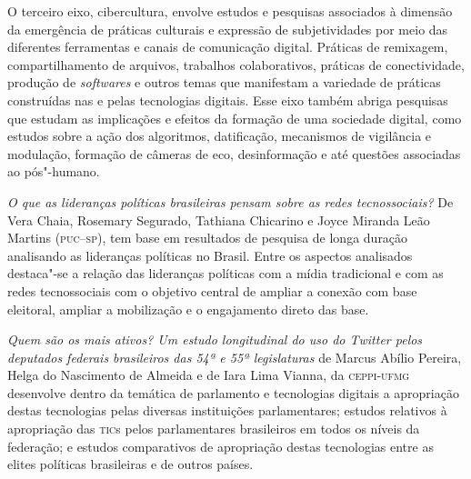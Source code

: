 O terceiro eixo, cibercultura, envolve estudos e pesquisas associados à
dimensão da emergência de práticas culturais e expressão de
subjetividades por meio das diferentes ferramentas e canais de
comunicação digital. Práticas de remixagem, compartilhamento de
arquivos, trabalhos colaborativos, práticas de conectividade, produção
de \emph{softwares} e outros temas que manifestam a variedade de práticas
construídas nas e pelas tecnologias digitais. Esse eixo também abriga
pesquisas que estudam as implicações e efeitos da formação de uma
sociedade digital, como estudos sobre a ação dos algoritmos,
datificação, mecanismos de vigilância e modulação, formação de câmeras
de eco, desinformação e até questões associadas ao pós"-humano.


\emph{O que as lideranças políticas brasileiras pensam sobre as redes
tecnossociais?} De Vera Chaia, Rosemary Segurado, Tathiana Chicarino e
Joyce Miranda Leão Martins (\textsc{puc--sp}), tem base em resultados de
pesquisa de longa duração analisando as lideranças políticas no Brasil.
Entre os aspectos analisados destaca"-se a relação das lideranças
políticas com a mídia tradicional e com as redes tecnossociais com o
objetivo central de ampliar a conexão com base eleitoral, ampliar a
mobilização e o engajamento direto das base.

\emph{Quem são os mais ativos? Um estudo longitudinal do uso do Twitter
pelos deputados federais brasileiros das 54ª e 55ª legislaturas} de
Marcus Abílio Pereira, Helga do Nascimento de Almeida e de Iara Lima
Vianna, da \textsc{ceppi}-\textsc{ufmg} desenvolve dentro da temática de parlamento e
tecnologias digitais a apropriação destas tecnologias pelas diversas
instituições parlamentares; estudos relativos à apropriação das \textsc{tic}s
pelos parlamentares brasileiros em todos os níveis da federação; e
estudos comparativos de apropriação destas tecnologias entre as elites
políticas brasileiras e de outros países.


